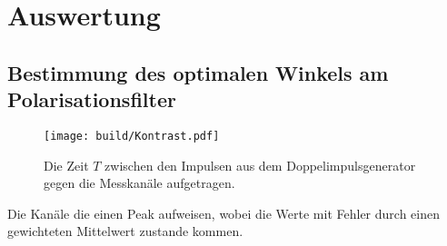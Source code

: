 \section{Auswertung}
\label{sec:Auswertung}

\subsection{Bestimmung des optimalen Winkels am Polarisationsfilter}
\begin{figure}
	\centering
	\texttt{[image: build/Kontrast.pdf]}
	\caption{Die Zeit $T$ zwischen den Impulsen aus dem Doppelimpulsgenerator gegen die Messkanäle aufgetragen.}
	\label{fig:erste}
\end{figure}
\begin{table}
	\centering
	\caption{Die Kanäle die einen Peak aufweisen, wobei die Werte mit Fehler durch einen gewichteten Mittelwert zustande kommen.}
	
\end{table}